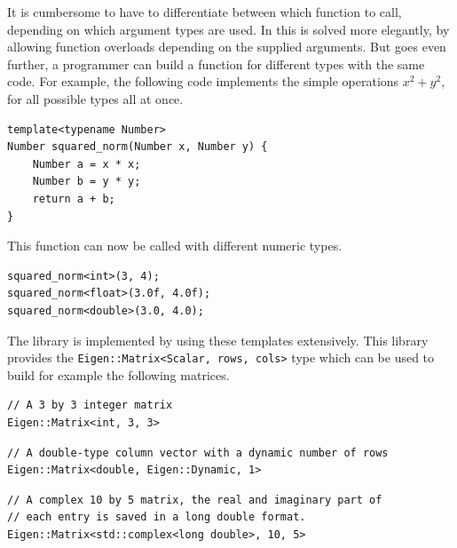 It is cumbersome to have to differentiate between which function to call, depending on which argument types are used. In \cpp{} this is solved more elegantly, by allowing function overloads depending on the supplied arguments. But \cpp{} goes even further, a programmer can build a function for different types with the same code. For example, the following code implements the simple operations $x^2 + y^2$, for all possible types all at once.
\begin{verbatim}
template<typename Number>
Number squared_norm(Number x, Number y) {
    Number a = x * x;
    Number b = y * y;
    return a + b;
}
\end{verbatim}
This function can now be called with different numeric types.
\begin{verbatim}
squared_norm<int>(3, 4);
squared_norm<float>(3.0f, 4.0f);
squared_norm<double>(3.0, 4.0);
\end{verbatim}

The library \Eigen{} is implemented by using these templates extensively. This library provides the \texttt{Eigen::Matrix<Scalar, rows, cols>} type which can be used to build for example the following matrices.
\begin{verbatim}
// A 3 by 3 integer matrix
Eigen::Matrix<int, 3, 3>
\end{verbatim}
\begin{verbatim}
// A double-type column vector with a dynamic number of rows
Eigen::Matrix<double, Eigen::Dynamic, 1>
\end{verbatim}
\begin{verbatim}
// A complex 10 by 5 matrix, the real and imaginary part of
// each entry is saved in a long double format.
Eigen::Matrix<std::complex<long double>, 10, 5> 
\end{verbatim}

